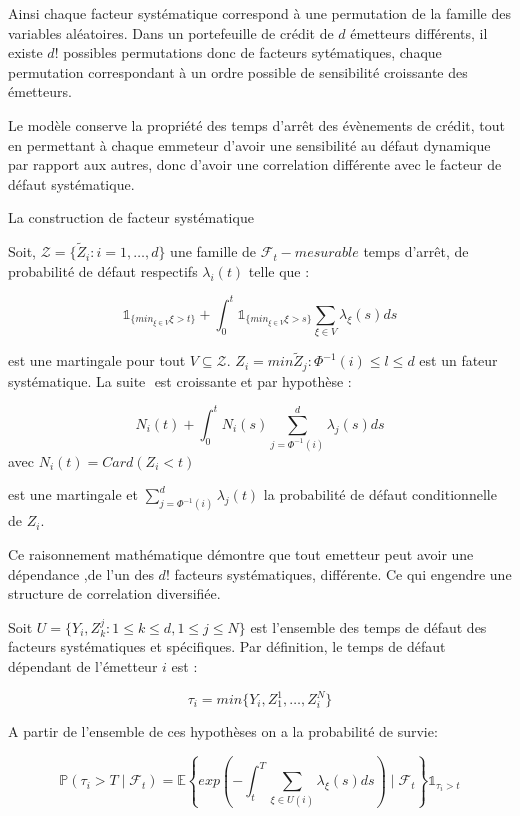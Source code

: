 \documentclass[10pt,a4paper]{article}
\begin{document}
	Ainsi chaque facteur systématique correspond à une permutation de la famille des variables aléatoires. Dans un portefeuille de crédit de $ d $ émetteurs différents, il existe $ d! $ possibles permutations donc de facteurs sytématiques, chaque permutation correspondant à un ordre possible de sensibilité croissante des émetteurs. 
	
	Le modèle conserve la propriété des temps d'arrêt des évènements de crédit, tout en permettant à chaque emmeteur d'avoir une sensibilité au défaut dynamique par rapport aux autres, donc d'avoir une correlation différente avec le facteur de défaut systématique.
	
	La construction de facteur systématique
	
	Soit, $ \mathcal{Z}  = \{ \tilde{Z}_i : i = 1,\ldots,d\} $ une famille de $ \mathcal{F}_t-mesurable $ temps d'arrêt, de probabilité de défaut respectifs $ \lambda_i(t) $ telle que :
	
	$$ \mathds{1}_{ \{ min_{ \xi \in V } \xi > t \} } + \int_0^{t} \mathds{1}_{ \{ min_{ \xi \in V } \xi > s \} } \sum_{\xi \in V} \lambda_\xi(s) ds $$
	
	
	est une martingale pour tout $ V \subseteq \mathcal{Z} $. $ Z_i = min{\tilde{Z}_j : \varPhi^{-1}(i)\leq l \leq d } $ est un fateur systématique. La suite $  $ est croissante et par hypothèse : 
	
	
	$$ N_i(t) + \int_0^{t} N_i(s)  \sum_{j=\varPhi^{-1}(i)}^d \lambda_j(s)ds $$ avec $ N_i(t) = Card(Z_i<t)  $
	
	
	est une martingale et $ \sum_{j = \varPhi^{-1}(i)}^{d} \lambda_j(t) $ la probabilité de défaut conditionnelle de $ Z_i $. 
	
	Ce raisonnement mathématique démontre que tout emetteur peut avoir une dépendance ,de l'un des $ d! $ facteurs systématiques, différente. Ce qui engendre une structure de correlation diversifiée. 
	
	
	Soit $ U = \{ Y_i,Z_k^{j}: 1\leq k \leq d, 1\leq j \leq N \}  $ est l'ensemble des temps de défaut des facteurs systématiques et spécifiques. Par définition, le temps de défaut dépendant de l'émetteur $ i $ est :
	
	$$ \tau_i = min\{ Y_i,Z_1^{1},\ldots,Z_i^{N} \} $$ 
	
	A partir de l'ensemble de ces hypothèses on a la probabilité de survie:
	
	$$ \mathbb{P}(\tau_i>T \mid \mathcal{F}_t)  = \mathbb{E} \left\{ exp\left(-\int_t^T \sum_{\xi \in U(i)} \lambda_\xi(s)ds\right) \mid \mathcal{F}_t \right\} \mathds{1}_{\tau_i>t} $$
	
	
\end{document}
